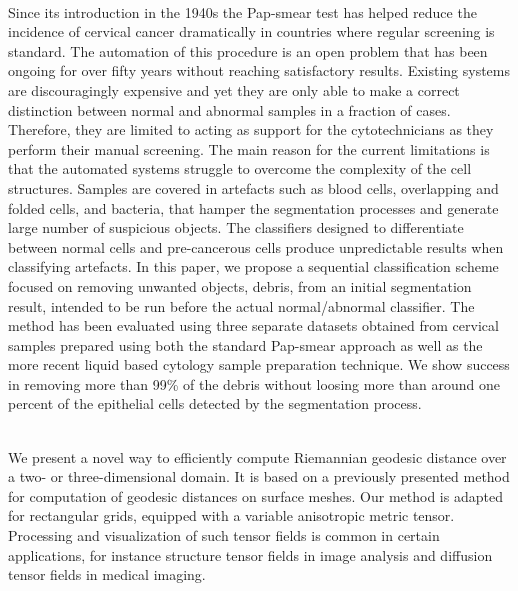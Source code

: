 {{\begin{enumerate}
\\ \aabstract
Since its introduction in the 1940s the Pap-smear test has helped reduce the incidence of cervical cancer dramatically in countries where regular screening is standard. The automation of this procedure is an open problem that has been ongoing for over fifty years without reaching satisfactory results. Existing systems are discouragingly expensive and yet they are only able to make a correct distinction between normal and abnormal samples in a fraction of cases. Therefore, they are limited to acting as support for the cytotechnicians as they perform their manual screening. The main reason for the current limitations is that the automated systems struggle to overcome the complexity of the cell structures. Samples are covered in artefacts such as blood cells, overlapping and folded cells, and bacteria, that hamper the segmentation processes and generate large number of suspicious objects. The classifiers designed to differentiate between normal cells and pre-cancerous cells produce unpredictable results when classifying artefacts. In this paper, we propose a sequential classification scheme focused on removing unwanted objects, debris, from an initial segmentation result, intended to be run before the actual normal/abnormal classifier. The method has been evaluated using three separate datasets obtained from cervical samples prepared using both the standard Pap-smear approach as well as the more recent liquid based cytology sample preparation technique. We show success in removing more than 99\% of the debris without loosing more than around one percent of the epithelial cells detected by the segmentation process.

\\ \aabstract
We present a novel way to efficiently compute Riemannian geodesic distance over a two- or three-dimensional domain. It is based on a previously presented method for computation of geodesic distances on surface meshes. Our method is adapted for rectangular grids, equipped with a variable anisotropic metric tensor. Processing and visualization of such tensor fields is common in certain applications, for instance structure tensor fields in image analysis and diffusion tensor fields in medical imaging.


\end{enumerate}}}
